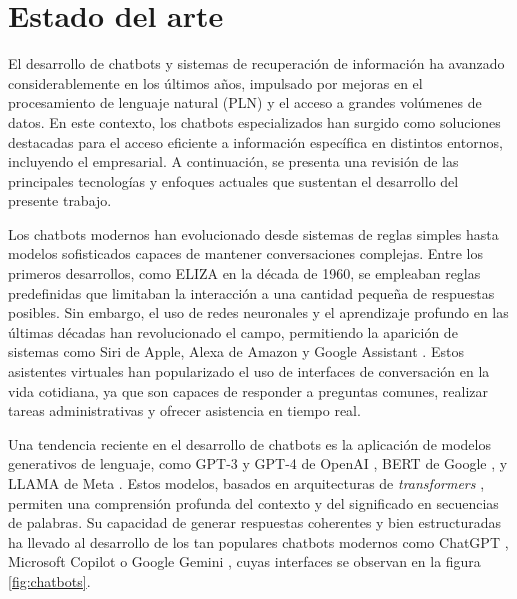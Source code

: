 \vspace{15mm}

\section{Estado del arte}

El desarrollo de chatbots y sistemas de recuperación de información ha avanzado considerablemente en los últimos años, 
impulsado por mejoras en el procesamiento de lenguaje natural (PLN) y el acceso a grandes volúmenes de datos. 
En este contexto, los chatbots especializados han surgido como soluciones destacadas para el acceso eficiente 
a información específica en distintos entornos, incluyendo el empresarial. A continuación, se presenta una revisión 
de las principales tecnologías y enfoques actuales que sustentan el desarrollo del presente trabajo.

Los chatbots modernos han evolucionado desde sistemas de reglas simples hasta modelos sofisticados capaces de 
mantener conversaciones complejas. Entre los primeros desarrollos, como ELIZA \citep{paper:eliza} en 
la década de 1960, se empleaban reglas predefinidas que limitaban la interacción a una cantidad pequeña de 
respuestas posibles. Sin embargo, el uso de redes neuronales y el aprendizaje profundo en las últimas décadas 
han revolucionado el campo, permitiendo la aparición de sistemas como Siri de Apple, Alexa de Amazon 
y Google Assistant \citep{article:voice-assistants}. Estos asistentes virtuales han popularizado el uso de interfaces 
de conversación en la vida cotidiana, ya que son capaces de responder a preguntas comunes, realizar tareas administrativas 
y ofrecer asistencia en tiempo real.

Una tendencia reciente en el desarrollo de chatbots es la aplicación de modelos generativos de lenguaje, como GPT-3 y GPT-4 
de OpenAI \citep{paper:gpt}, BERT de Google \citep{paper:bert}, y LLAMA de Meta \citep{paper:llama}. Estos modelos, basados 
en arquitecturas de \textit{transformers} \citep{paper:transformers}, permiten una comprensión profunda del contexto y del 
significado en secuencias de palabras. Su capacidad de generar respuestas coherentes y bien estructuradas ha llevado al 
desarrollo de los tan populares chatbots modernos como ChatGPT \citep{website:chatgpt}, Microsoft Copilot \citep{website:copilot}
o Google Gemini \citep{website:gemini}, cuyas interfaces se observan en la figura \ref{fig:chatbots}.

